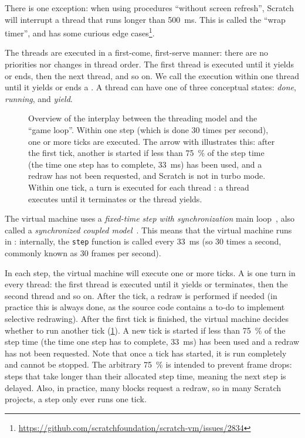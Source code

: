 \documentclass[../main]{subfiles}
\begin{document}
There is one exception: when using procedures ``without screen refresh'', Scratch will interrupt a thread that runs longer than \qty{500}{\milli\second}.
This is called the ``wrap timer'', and has some curious edge cases\footnote{\url{https://github.com/scratchfoundation/scratch-vm/issues/2834}}.

The threads are executed in a first-come, first-serve manner: there are no priorities nor changes in thread order.
The first thread is executed until it yields or ends, then the next thread, and so on.
We call the execution within one thread until it yields or ends a .
A thread can have one of three conceptual states: \emph{done}, \emph{running}, and \emph{yield}.

\begin{figure}
    \centering
    
    \caption{Overview of the interplay between the threading model and the ``game loop''. Within one step (which is done 30 times per second), one or more ticks are executed. The arrow with  illustrates this: after the first tick, another is started if less than \qty{75}{\percent} of the step time (the time one step has to complete, \qty{33}{\milli\second}) has been used, and a redraw has not been requested, and Scratch is not in turbo mode. Within one tick, a turn is executed for each thread : a thread executes until it terminates or the thread yields.}
    \label{fig:scratch-model-explained}
\end{figure}

The virtual machine uses a \emph{fixed-time step with synchronization} main loop~\autocite{nystromGameProgrammingPatterns2014}, also called a \emph{synchronized coupled model}~\autocite{valenteRealTimeGame2005}.
This means that the virtual machine runs in : internally, the \texttt{step} function is called every \qty{33}{\milli\second} (so 30 times a second, commonly known as 30 frames per second).

In each step, the virtual machine will execute one or more ticks.
A  is one turn in every thread: the first thread is executed until it yields or terminates, then the second thread and so on.
After the tick, a redraw is performed if needed (in practice this is always done, as the source code contains a to-do to implement selective redrawing).
After the first tick is finished, the virtual machine decides whether to run another tick (\cref{fig:scratch-model-explained}).
A new tick is started if less than \qty{75}{\percent} of the step time (the time one step has to complete, \qty{33}{\milli\second}) has been used and a redraw has not been requested.
Note that once a tick has started, it is run completely and cannot be stopped.
The arbitrary \qty{75}{\percent} is intended to prevent frame drops: steps that take longer than their allocated step time, meaning the next step is delayed.
Also, in practice, many blocks request a redraw, so in many Scratch projects, a step only ever runs one tick.
\end{document}
